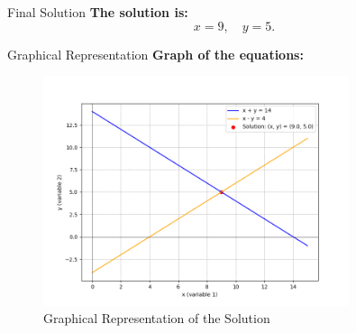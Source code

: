 \documentclass{beamer}
\begin{document}
\begin{frame}{Final Solution}
\textbf{The solution is:}
\[
x = 9, \quad y = 5.
\]
\end{frame}

\begin{frame}{Graphical Representation}
\textbf{Graph of the equations:}
\begin{figure}
    \centering
    \includegraphics[width=0.8\textwidth]{figs/fig.png}
    \caption{Graphical Representation of the Solution}
\end{figure}
\end{frame}

\end{document}

